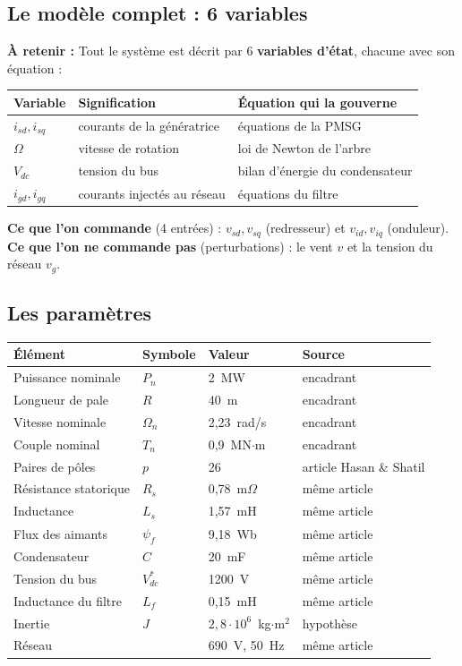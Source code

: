\documentclass[11pt,a4paper]{article}
\newcommand{\Resume}{\textbf{À retenir : }}
\begin{document}
\subsection{Le modèle complet : 6 variables}
\begin{resume}
\Resume
Tout le système est décrit par 6 \textbf{variables d'état}, chacune avec son équation :
\begin{center}
\begin{tabular}{lll}
\toprule
Variable & Signification & Équation qui la gouverne\\
\midrule
$i_{sd}, i_{sq}$ & courants de la génératrice & équations de la PMSG\\
$\Omega$ & vitesse de rotation & loi de Newton de l'arbre\\
$V_{dc}$ & tension du bus & bilan d'énergie du condensateur\\
$i_{gd}, i_{gq}$ & courants injectés au réseau & équations du filtre\\
\bottomrule
\end{tabular}
\end{center}
\textbf{Ce que l'on commande} (4 entrées) : $v_{sd}, v_{sq}$ (redresseur) et $v_{id}, v_{iq}$ (onduleur).\\
\textbf{Ce que l'on ne commande pas} (perturbations) : le vent $v$ et la tension du réseau $v_g$.
\end{resume}

\subsection{Les paramètres}
\begin{center}
\begin{tabular}{llll}
\toprule
Élément & Symbole & Valeur & Source\\
\midrule
Puissance nominale & $P_n$ & 2~MW & encadrant\\
Longueur de pale & $R$ & 40~m & encadrant\\
Vitesse nominale & $\Omega_n$ & 2,23~rad/s & encadrant\\
Couple nominal & $T_n$ & 0,9~MN$\cdot$m & encadrant\\
Paires de pôles & $p$ & 26 & article Hasan \& Shatil\\
Résistance statorique & $R_s$ & 0,78~m$\Omega$ & même article\\
Inductance & $L_s$ & 1,57~mH & même article\\
Flux des aimants & $\psi_f$ & 9,18~Wb & même article\\
Condensateur & $C$ & 20~mF & même article\\
Tension du bus & $V_{dc}^*$ & 1200~V & même article\\
Inductance du filtre & $L_f$ & 0,15~mH & même article\\
Inertie & $J$ & $2{,}8\cdot10^6$~kg$\cdot$m$^2$ & hypothèse\\
Réseau & & 690~V, 50~Hz & même article\\
\bottomrule
\end{tabular}
\end{center}
\end{document}
